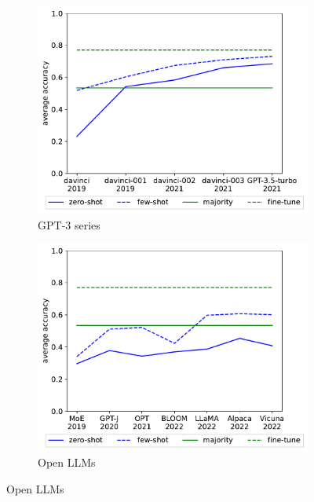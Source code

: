 \documentclass[letterpaper]{article} %
\begin{document}
\begin{figure}[h!]
        \centering
        \begin{subfigure}[b]{0.475\textwidth}
            \centering
            \includegraphics[scale=0.45]{img/output-zero-few-shot-all-dataset.pdf}
            \caption[]%
            {{GPT-3 series}}    
            \label{fig:GPT-datasets}
        \end{subfigure}
        \begin{subfigure}[b]{0.475\textwidth}   
            \centering 
            \includegraphics[scale=0.45]{img/output-zero-few-shot-all-dataset-recent-llm.pdf}
            \caption[]%
            {{Open LLMs}}    

\end{subfigure}
\end{figure}
\end{document}
